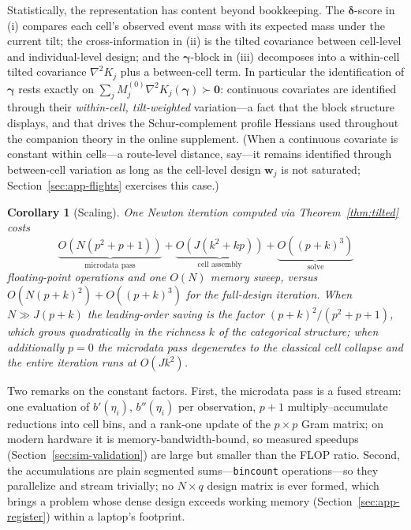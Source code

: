 \documentclass[11pt]{article}
\newtheorem{corollary}{Corollary}
\newcommand{\bgamma}{\bm{\gamma}}
\newcommand{\bdelta}{\bm{\delta}}
\newcommand{\bw}{\mathbf{w}}
\newcommand{\bzero}{\mathbf{0}}
\begin{document}
Statistically, the representation has content beyond bookkeeping.  The
$\bdelta$-score in (i) compares each cell's observed event mass with its
expected mass under the current tilt; the cross-information in (ii) is
the tilted covariance between cell-level and individual-level design; and
the $\bgamma$-block in (iii) decomposes into a within-cell tilted
covariance $\nabla^2 K_j$ plus a between-cell term.  In particular the
identification of $\bgamma$ rests exactly on
$\sum_j M_j^{(0)} \nabla^2 K_j(\bgamma) \succ \bzero$: continuous
covariates are identified through their \emph{within-cell, tilt-weighted}
variation---a fact that the block structure displays, and that drives
the Schur-complement profile Hessians used throughout the companion
theory in the online supplement.  (When a continuous covariate is
constant within cells---a route-level distance, say---it remains
identified through between-cell variation as long as the cell-level
design $\bw_j$ is not saturated; Section~\ref{sec:app-flights}
exercises this case.)

\begin{corollary}[Scaling]\label{cor:complexity}
One Newton iteration computed via Theorem~\ref{thm:tilted} costs
\[
\underbrace{O\!\left(N(p^2 + p + 1)\right)}_{\text{microdata pass}}
+ \underbrace{O\!\left(J(k^2 + kp)\right)}_{\text{cell assembly}}
+ \underbrace{O\!\left((p+k)^3\right)}_{\text{solve}}
\]
floating-point operations and one $O(N)$ memory sweep, versus
$O\!\left(N(p+k)^2\right) + O\!\left((p+k)^3\right)$ for the full-design
iteration.  When $N \gg J(p+k)$ the leading-order saving is the factor
$(p+k)^2 / (p^2+p+1)$, which grows quadratically in the richness $k$ of
the categorical structure; when additionally $p = 0$ the microdata pass
degenerates to the classical cell collapse and the entire iteration runs
at $O(Jk^2)$.
\end{corollary}

Two remarks on the constant factors.  First, the microdata pass is a
fused stream: one evaluation of $b'(\eta_i)$, $b''(\eta_i)$ per
observation, $p+1$ multiply--accumulate reductions into cell bins, and a
rank-one update of the $p \times p$ Gram matrix; on modern hardware it is
memory-bandwidth-bound, so measured speedups (Section~\ref{sec:sim-validation})
are large but smaller than the FLOP ratio.  Second, the accumulations are
plain segmented sums---\texttt{bincount} operations---so they
parallelize and stream trivially; no $N \times q$ design matrix is ever
formed, which brings a problem whose dense design exceeds working memory
(Section~\ref{sec:app-register}) within a laptop's footprint.
\end{document}
